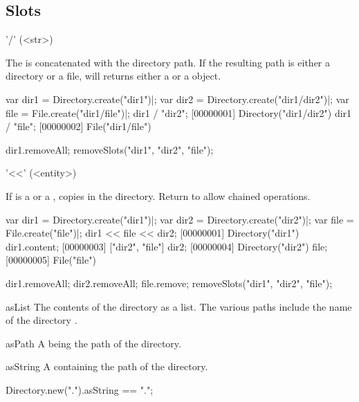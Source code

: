 \subsection{Slots}
\begin{urbiscriptapi}
\item['/'](<str>)
  \experimental{}

  The   is concatenated with the directory path.
  If the resulting path is either a directory or a file,  will
  returns either a  or a  object.
\begin{urbiscript}
var dir1 = Directory.create("dir1")|;
var dir2 = Directory.create("dir1/dir2")|;
var file = File.create("dir1/file")|;
dir1 / "dir2";
[00000001] Directory("dir1/dir2")
dir1 / "file";
[00000002] File("dir1/file")
\end{urbiscript}
\begin{urbicomment}
dir1.removeAll;
removeSlots("dir1", "dir2", "file");
\end{urbicomment}


\item['<<'](<entity>)
  \experimental{}

  If  is a  or a ,
   copies  in the \this directory.
  Return \this to allow chained operations.
\begin{urbiscript}
var dir1 = Directory.create("dir1")|;
var dir2 = Directory.create("dir2")|;
var file = File.create("file")|;
dir1 << file << dir2;
[00000001] Directory("dir1")
dir1.content;
[00000003] ["dir2", "file"]
dir2;
[00000004] Directory("dir2")
file;
[00000005] File("file")
\end{urbiscript}
\begin{urbicomment}
dir1.removeAll;
dir2.removeAll;
file.remove;
removeSlots("dir1", "dir2", "file");
\end{urbicomment}


\item[asList]
  The contents of the directory as a  list.  The
  various paths include the name of the directory \this.


\item[asPath] A  being the path of the directory.


\item[asString] A  containing the path of the directory.
\begin{urbiassert}
Directory.new(".").asString == ".";
\end{urbiassert}



\end{urbiscriptapi}
